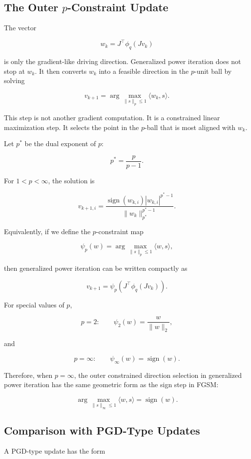 \documentclass{article}
\begin{document}
\subsection{The Outer \(p\)-Constraint Update}

The vector

\[
w_k=J^\top \phi_q(Jv_k)
\]

is only the gradient-like driving direction. Generalized power iteration does not stop at \(w_k\). It then converts \(w_k\) into a feasible direction in the \(p\)-unit ball by solving

\[
v_{k+1}
=
\arg\max_{\|s\|_p\le 1}
\langle w_k,s\rangle.
\]

This step is not another gradient computation. It is a constrained linear maximization step. It selects the point in the \(p\)-ball that is most aligned with \(w_k\).

Let \(p^\ast\) be the dual exponent of \(p\):

\[
p^\ast=\frac{p}{p-1}.
\]

For \(1<p<\infty\), the solution is

\[
v_{k+1,i}
=
\frac{
\operatorname{sign}(w_{k,i})|w_{k,i}|^{p^\ast-1}
}{
\|w_k\|_{p^\ast}^{p^\ast-1}
}.
\]

Equivalently, if we define the \(p\)-constraint map

\[
\psi_p(w)
=
\arg\max_{\|s\|_p\le 1}\langle w,s\rangle,
\]

then generalized power iteration can be written compactly as

\[
v_{k+1}
=
\psi_p
\left(
J^\top\phi_q(Jv_k)
\right).
\]

For special values of \(p\),

\[
p=2:
\qquad
\psi_2(w)=\frac{w}{\|w\|_2},
\]

and

\[
p=\infty:
\qquad
\psi_\infty(w)=\operatorname{sign}(w).
\]

Therefore, when \(p=\infty\), the outer constrained direction selection in generalized power iteration has the same geometric form as the sign step in FGSM:

\[
\arg\max_{\|s\|_\infty\le 1}
\langle w,s\rangle
=
\operatorname{sign}(w).
\]

\subsection{Comparison with PGD-Type Updates}

A PGD-type update has the form
\end{document}
